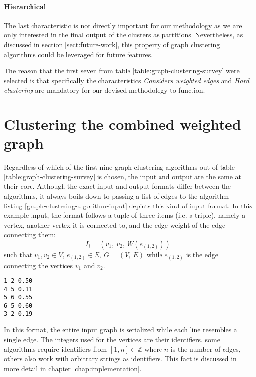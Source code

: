 \documentclass[12pt,a4paper]{report}
\begin{document}
\paragraph{Hierarchical}
The last characteristic is not directly important for our methodology
as we are only interested in the final output of the clusters as partitions.
Nevertheless, as discussed in section \ref{sect:future-work},
this property of graph clustering algorithms could be leveraged for future features.
\newline

The reason that the first seven from table \ref{table:graph-clustering-survey}
were selected is that specifically the characteristics
\textit{Considers weighted edges} and \textit{Hard clustering} are mandatory
for our devised methodology to function.



\section{Clustering the combined weighted graph}

Regardless of which of the first nine graph clustering algorithms out of
table \ref{table:graph-clustering-survey} is chosen, the input and output
are the same at their core.
Although the exact input and output formats differ between the algorithms,
it always boils down to passing a list of edges to the algorithm ---
listing \ref{graph-clustering-algorithm-input} depicts this kind of input format.
In this example input, the format follows a tuple of three items (i.e. a triple),
namely a vertex, another vertex it is connected to, and the edge weight of the
edge connecting them:
\[
  I_i = (v_1, \ v_2, \ W(e_{(1,2)}))
\]
such that \(v_1, v_2 \in V, \ e_{(1,2)} \in E, \ G = (V, \ E)\) while
\(e_{(1,2)}\) is the edge connecting the vertices \(v_1\) and \(v_2\).

\begin{lstlisting}[caption=Example graph clustering algorithm input, label=graph-clustering-algorithm-input, breaklines=true]
1 2 0.50
4 5 0.11
5 6 0.55
6 5 0.60
3 2 0.19
\end{lstlisting}

In this format, the entire input graph is serialized while each line resembles
a single edge. The integers used for the vertices are their identifiers,
some algorithms require identifiers from \([1, n] \in \mathbb{Z}\) where \(n\)
is the number of edges, others also work with arbitrary strings as identifiers.
This fact is discussed in more detail in chapter \ref{chap:implementation}.
\end{document}
